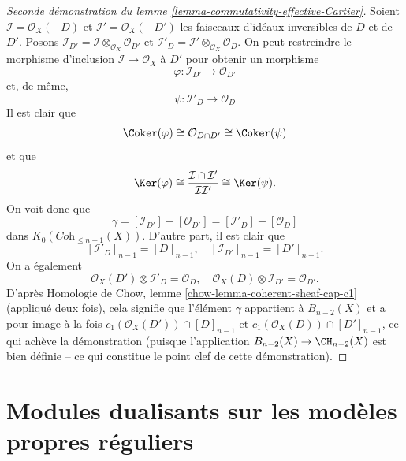 \begin{proof}[Seconde démonstration du lemme \ref{lemma-commutativity-effective-Cartier}]
Soient $\mathcal{I} = \mathcal{O}_X(-D)$ et
$\mathcal{I}' = \mathcal{O}_X(-D')$ les faisceaux
d'idéaux inversibles de $D$ et de $D'$.
Posons
$\mathcal{I}_{D'} = \mathcal{I} \otimes_{\mathcal{O}_X} \mathcal{O}_{D'}$
et
$\mathcal{I}'_D = \mathcal{I}' \otimes_{\mathcal{O}_X} \mathcal{O}_D$.
On peut restreindre le morphisme d'inclusion $\mathcal{I} \to \mathcal{O}_X$
à $D'$ pour obtenir un morphisme
$$
\varphi : \mathcal{I}_{D'} \longrightarrow \mathcal{O}_{D'}
$$
et, de même,
$$
\psi : \mathcal{I}'_D \longrightarrow \mathcal{O}_D
$$
Il est clair que
$$
\Coker(\varphi)
\cong
\mathcal{O}_{D \cap D'}
\cong
\Coker(\psi)
$$
et que
$$
\Ker(\varphi)
\cong
\frac{\mathcal{I} \cap \mathcal{I}'}{\mathcal{I}\mathcal{I}'}
\cong
\Ker(\psi).
$$
On voit donc que
$$
\gamma =
[\mathcal{I}_{D'}] - [\mathcal{O}_{D'}]
=
[\mathcal{I}'_D] - [\mathcal{O}_D]
$$
dans $K_0(\textit{Coh}_{\leq n - 1}(X))$. D'autre part, il est clair que
$$
[\mathcal{I}'_D]_{n - 1} = [D]_{n - 1}, \quad
[\mathcal{I}_{D'}]_{n - 1} = [D']_{n - 1}.
$$
On a également
$$
\mathcal{O}_X(D') \otimes \mathcal{I}'_D = \mathcal{O}_D, \quad
\mathcal{O}_X(D) \otimes \mathcal{I}_{D'} = \mathcal{O}_{D'}.
$$
D'après Homologie de Chow, lemme \ref{chow-lemma-coherent-sheaf-cap-c1}
(appliqué deux fois),
cela signifie que l'élément $\gamma$ appartient à $B_{n - 2}(X)$ et
a pour image à la fois $c_1(\mathcal{O}_X(D')) \cap [D]_{n - 1}$ et
$c_1(\mathcal{O}_X(D)) \cap [D']_{n - 1}$, ce qui achève la démonstration (puisque
l'application $B_{n - 2}(X) \to \CH_{n - 2}(X)$ est bien définie -- ce qui constitue
le point clef de cette démonstration).
\end{proof}
      
 
    
     
  
   
 




\section{Modules dualisants sur les modèles propres réguliers}
\label{section-dualizing}

